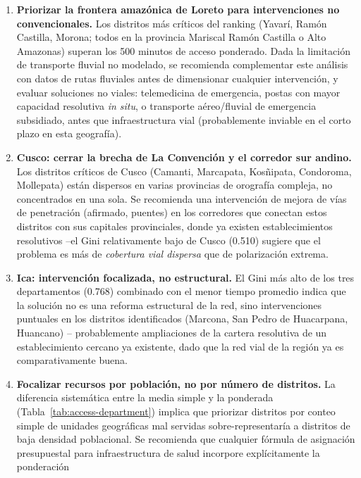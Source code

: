 \documentclass[11pt]{article}
\begin{document}
\begin{enumerate}
  \item \textbf{Priorizar la frontera amazónica de Loreto para
    intervenciones no convencionales.} Los distritos más críticos del
    ranking (Yavarí, Ramón Castilla, Morona; todos en la provincia
    Mariscal Ramón Castilla o Alto Amazonas) superan los 500 minutos de
    acceso ponderado. Dada la limitación de transporte fluvial no
    modelado, se recomienda complementar este análisis con datos de rutas
    fluviales antes de dimensionar cualquier intervención, y evaluar
    soluciones no viales: telemedicina de emergencia, postas con mayor
    capacidad resolutiva \textit{in situ}, o transporte aéreo/fluvial de
    emergencia subsidiado, antes que infraestructura vial (probablemente
    inviable en el corto plazo en esta geografía).
  \item \textbf{Cusco: cerrar la brecha de La Convención y el corredor sur
    andino.} Los distritos críticos de Cusco (Camanti, Marcapata,
    Kosñipata, Condoroma, Mollepata) están dispersos en varias provincias
    de orografía compleja, no concentrados en una sola. Se recomienda una
    intervención de mejora de vías de penetración (afirmado, puentes) en
    los corredores que conectan estos distritos con sus capitales
    provinciales, donde ya existen establecimientos resolutivos --el
    Gini relativamente bajo de Cusco (0.510) sugiere que el problema es
    más de \emph{cobertura vial dispersa} que de polarización extrema.
  \item \textbf{Ica: intervención focalizada, no estructural.} El Gini más
    alto de los tres departamentos (0.768) combinado con el menor tiempo
    promedio indica que la solución no es una reforma estructural de la
    red, sino intervenciones puntuales en los distritos identificados
    (Marcona, San Pedro de Huacarpana, Huancano) -- probablemente
    ampliaciones de la cartera resolutiva de un establecimiento cercano ya
    existente, dado que la red vial de la región ya es comparativamente
    buena.
  \item \textbf{Focalizar recursos por población, no por número de
    distritos.} La diferencia sistemática entre la media simple y la
    ponderada (Tabla~\ref{tab:access-department}) implica que priorizar
    distritos por conteo simple de unidades geográficas mal servidas
    sobre-representaría a distritos de baja densidad poblacional. Se
    recomienda que cualquier fórmula de asignación presupuestal para
    infraestructura de salud incorpore explícitamente la ponderación

\end{enumerate}
\end{document}
